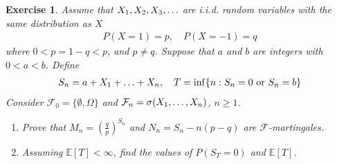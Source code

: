 \documentclass[12pt]{article}
\theoremstyle{colon}
\newtheorem{exercise}{Exercise}
\begin{document}
\begin{exercise}
  Assume that $X_1, X_2, X_3, \mathellipsis$ are i.i.d. random variables with the same distribution as $X$
  \begin{gather*}
    P(X = 1) = p, \quad P(X = -1) = q
  \end{gather*}
  where $0 < p = 1 - q < p$, and $p \neq q$. Suppose that $a$ and $b$ are integers with $0 < a < b$. Define
  \begin{gather*}
    S_n = a + X_1 + \mathellipsis + X_n, \quad T = \inf \{n : S_n = 0 \text{ or } S_n = b\}
  \end{gather*}
  Consider $\mathcal{F}_0 = \{ \emptyset, \Omega \}$ and $\mathcal{F}_n = \sigma(X_1, \mathellipsis, X_n)$, $n \geq 1$.
  \begin{enumerate}[label=\alph*)]
    \item Prove that $M_n = \left( \frac{q}{p} \right)^{S_n}$ and $N_n = S_n - n(p - q)$ are $\mathcal{F}$-martingales.
    \item Assuming $\mathbb{E}[T] < \infty$, find the values of $P(S_T = 0)$ and $\mathbb{E}[T]$.
  \end{enumerate}
\end{exercise}
\end{document}
